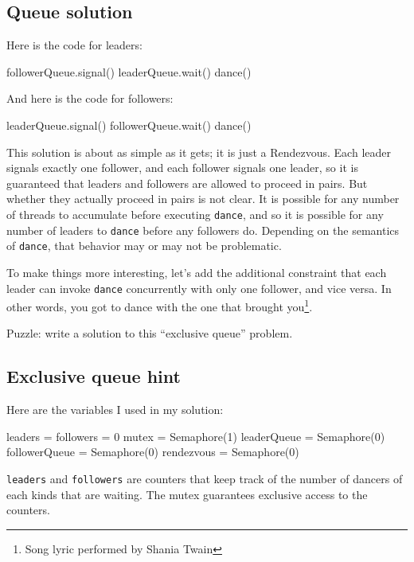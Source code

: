 \documentclass{book}
\begin{document}
\subsection {Queue solution}

Here is the code for leaders:

\begin{unbreakable}[title={Queue solution (leaders)}]{}
followerQueue.signal()
leaderQueue.wait()
dance()
\end{unbreakable}

And here is the code for followers:

\begin{unbreakable}[title={Queue solution (followers)}]{}
leaderQueue.signal()
followerQueue.wait()
dance()
\end{unbreakable}

This solution is about as simple as it gets; it is just a Rendezvous.
Each leader signals exactly one follower, and each follower signals
one leader, so it is guaranteed that leaders and followers are
allowed to proceed in pairs.  But whether they actually proceed in
pairs is not clear.  It is possible for any number of threads to
accumulate before executing {\tt dance}, and so it is possible for
any number of leaders to {\tt dance} before any followers do.
Depending on the semantics of {\tt dance}, that behavior may or
may not be problematic.

To make things more interesting, let's add the additional constraint
that each leader can invoke {\tt dance} concurrently with only
one follower, and vice versa.  In other words, you got to dance
with the one that brought you\footnote{Song lyric performed by Shania
    Twain}.

Puzzle: write a solution to this ``exclusive queue'' problem.


\subsection {Exclusive queue hint}

Here are the variables I used in my solution:

\begin{unbreakable}[title={Queue hint}]{}
leaders = followers = 0
mutex = Semaphore(1)
leaderQueue = Semaphore(0)
followerQueue = Semaphore(0)
rendezvous = Semaphore(0)
\end{unbreakable}

{\tt leaders} and {\tt followers} are counters that
keep track of the number of dancers of each kinds that are
waiting.  The mutex guarantees exclusive access to the counters.
\end{document}
